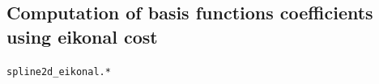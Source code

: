\documentclass[10pt,a4paper]{article} %
\newcommand{\trsp}{{\scriptscriptstyle\top}}
\newcommand{\filename}[1]{\colorbox{rr2}{\color{white}\texttt{#1}}}
\newcommand{\new}{{\!\scriptscriptstyle\mathrm{new}}}
\begin{document}





\subsection{Computation of basis functions coefficients using eikonal cost}
\begin{flushright}
\filename{spline2d_eikonal.*}
\end{flushright}

\end{document}
